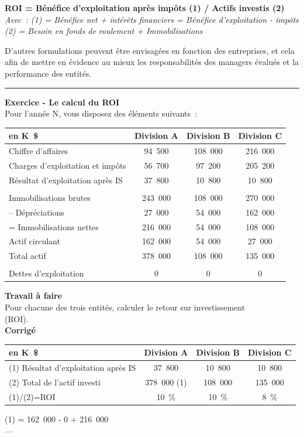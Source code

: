 \documentclass{kaobook}
\begin{document}
\begin{center}
\textbf{ROI = Bénéfice d'exploitation après impôts (1) / Actifs investis (2)}\\
\emph{Avec : (1) = Bénéfice net + intérêts financiers = Bénéfice d'exploitation - impôts (2) = Besoin en fonds de roulement + Immobilisations}\\
\end{center}
D'autres formulations peuvent être envisagées en fonction des entreprises, et cela afin de mettre en évidence au mieux les responsabilités des managers évalués et la performance des entités.\\

\noindent\rule{\textwidth}{0.5pt}
\textbf{Exercice - Le calcul du ROI}\\
Pour l'année N, vous disposez des éléments suivants :\\
\begin{center}
\begin{tabular}{l c c c}
en K \$ & Division A & Division B & Division C\\
\hline
Chiffre d'affaires & 94 500 & 108 000 & 216 000\\
Charges d'exploitation et impôts & 56 700 & 97 200 & 205 200\\
Résultat d'exploitation après IS & 37 800 & 10 800 & 10 800\\
 &  &  & \\
Immobilisations brutes & 243 000 & 108 000 & 270 000\\
-- Dépréciations & 27 000 & 54 000 & 162 000\\
= Immobilisations nettes & 216 000 & 54 000 & 108 000\\
Actif circulant & 162 000 & 54 000 & 27 000\\
Total actif & 378 000 & 108 000 & 135 000\\
 &  &  & \\
Dettes d'exploitation & 0 & 0 & 0\\
\end{tabular}
\end{center}

\textbf{Travail à faire}\\
Pour chacune des trois entités, calculer le retour sur investissement\\
(ROI).\\

\textbf{Corrigé}\\
\begin{center}
\begin{tabular}{l c c c}
en K \$ & Division A & Division B & Division C\\
\hline
(1) Résultat d'exploitation après IS & 37 800 & 10 800 & 10 800\\
(2) Total de l'actif investi & 378 000 (1) & 108 000 & 135 000\\
(1)/(2)=ROI & 10 \% & 10 \% & 8 \%\\
\end{tabular}
\end{center}
(1) = 162 000 - 0 + 216 000\\
---\\
\end{document}
